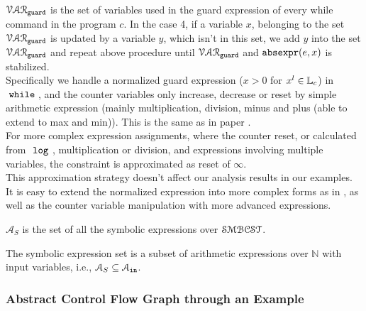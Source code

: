     $\mathcal{VAR}_{\mathtt{guard}}$ is the set of variables used in the guard expression of every while command in the program $c$. 
  In the case 4, if a variable $x$, belonging to the set 
  $\mathcal{VAR}_{\mathtt{guard}}$ is updated by a variable $y$, which isn't in this set, 
  we add $y$ into the set $\mathcal{VAR}_{\mathtt{guard}}$ and repeat 
  above procedure  until $\mathcal{VAR}_{\mathtt{guard}}$ and $\mathtt{abs}{\mathtt{expr}}(e, x)$ is stabilized. 
  \\
Specifically 
we handle a 
normalized guard expression ($ x > 0$ for $x^l \in \mathbb{L}_c$)
 in $\;\mathtt{while}\;$, and 
the counter variables only increase, decrease or reset by 
simple arithmetic expression (mainly multiplication, division, minus and plus (able to extend to max and min)). 
This is the same as in paper \cite{sinn2017complexity}. 
\\
For more complex expression assignments, where the counter reset, or calculated from $~\mathtt{log}~$, 
multiplication or division, and expressions involving multiple variables, the constraint is approximated as reset of $\infty$.
\\
This approximation strategy
doesn't affect our analysis results in our examples. It is easy to extend the normalized expression 
into more complex forms as in \cite{sinn2017complexity}, as well as the 
counter variable manipulation with more advanced expressions.
\begin{defn}
  $\mathcal{A}_{S}$ is the set of all the symbolic expressions 
over $\mathcal{SMBCST}$.
\end{defn}
The symbolic expression set is a subset of arithmetic expressions over $\mathbb{N}$ with input variables, 
i.e., $\mathcal{A}_{S} \subseteq \mathcal{A}_{\mathtt{in}}$.
\subsubsection{Abstract Control Flow Graph through an Example}
